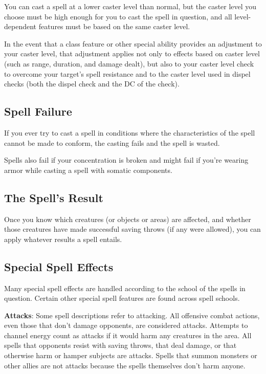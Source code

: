You can cast a spell at a lower caster level than normal, but the caster level you choose must be high enough for you to cast the spell in question, and all level-dependent features must be based on the same caster level. 
				
In the event that a class feature or other special ability provides an adjustment to your caster level, that adjustment applies not only to effects based on caster level (such as range, duration, and damage dealt), but also to your caster level check to overcome your target's spell resistance and to the caster level used in dispel checks (both the dispel check and the DC of the check). 
				
\subsection{Spell Failure}

				
If you ever try to cast a spell in conditions where the characteristics of the spell cannot be made to conform, the casting fails and the spell is wasted.
				
Spells also fail if your concentration is broken and might fail if you're wearing armor while casting a spell with somatic components.
				
\subsection{The Spell's Result}

				
Once you know which creatures (or objects or areas) are affected, and whether those creatures have made successful saving throws (if any were allowed), you can apply whatever results a spell entails.
				
\subsection{Special Spell Effects}

				
Many special spell effects are handled according to the school of the spells in question. Certain other special spell features are found across spell schools.
				
\textbf{Attacks}: Some spell descriptions refer to attacking. All offensive combat actions, even those that don't damage opponents, are considered attacks. Attempts to channel energy count as attacks if it would harm any creatures in the area. All spells that opponents resist with saving throws, that deal damage, or that otherwise harm or hamper subjects are attacks. Spells that summon monsters or other allies are not attacks because the spells themselves don't harm anyone.
				
